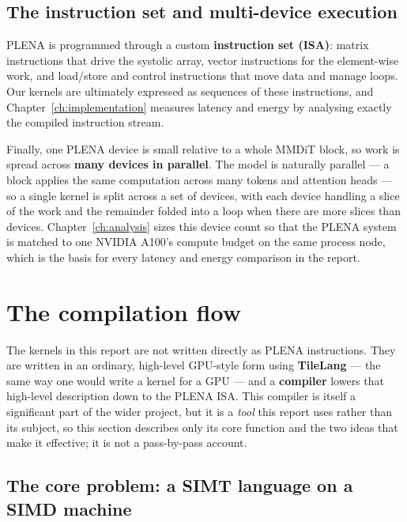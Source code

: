 \documentclass[11pt]{report}
\begin{document}
\subsection{The instruction set and multi-device execution}

PLENA is programmed through a custom \textbf{instruction set (ISA)}: matrix
instructions that drive the systolic array, vector instructions for the
element-wise work, and load/store and control instructions that move data
and manage loops. Our kernels are ultimately expressed as sequences of
these instructions, and Chapter~\ref{ch:implementation} measures latency
and energy by analysing exactly the compiled instruction stream.

Finally, one PLENA device is small relative to a whole MMDiT block, so work
is spread across \textbf{many devices in parallel}. The model is naturally
parallel --- a block applies the same computation across many tokens and
attention heads --- so a single kernel is split across a set of devices,
with each device handling a slice of the work and the remainder folded into
a loop when there are more slices than devices. Chapter~\ref{ch:analysis}
sizes this device count so that the PLENA system is matched to one NVIDIA
A100's compute budget on the same process node, which is the basis for
every latency and energy comparison in the report.

\section{The compilation flow}
\label{sec:compiler}

The kernels in this report are not written directly as PLENA instructions.
They are written in an ordinary, high-level GPU-style form using
\textbf{TileLang} --- the same way one would write a kernel for a GPU ---
and a \textbf{compiler} lowers that high-level description down to the
PLENA ISA. This compiler is itself a significant part of the wider project,
but it is a \emph{tool} this report uses rather than its subject, so this
section describes only its core function and the two ideas that make it
effective; it is not a pass-by-pass account.

\subsection{The core problem: a SIMT language on a SIMD machine}
\end{document}
